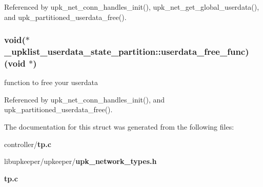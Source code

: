 Referenced by upk\_\-net\_\-conn\_\-handles\_\-init(), upk\_\-net\_\-get\_\-global\_\-userdata(), and upk\_\-partitioned\_\-userdata\_\-free().

\subsubsection[{userdata\_\-free\_\-func}]{\setlength{\rightskip}{0pt plus 5cm}void($\ast$ {\bf \_\-upklist\_\-userdata\_\-state\_\-partition::userdata\_\-free\_\-func})(void $\ast$)}\label{struct__upklist__userdata__state__partition_aa8508108ec668d8779a2cb9d951a6328}
function to free your userdata 

Referenced by upk\_\-net\_\-conn\_\-handles\_\-init(), and upk\_\-partitioned\_\-userdata\_\-free().



The documentation for this struct was generated from the following files:\begin{DoxyCompactItemize}
\item 
controller/{\bf tp.c}\item 
libupkeeper/upkeeper/{\bf upk\_\-network\_\-types.h}\item 
{\bf tp.c}\end{DoxyCompactItemize}
